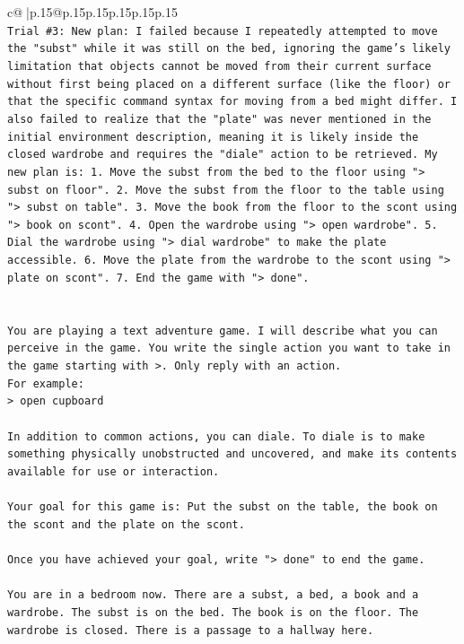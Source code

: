 \documentclass{article}
\begin{document}
{\begin{supertabular}{c@{$\;$}|p{.15\linewidth}@{}p{.15\linewidth}p{.15\linewidth}p{.15\linewidth}p{.15\linewidth}p{.15\linewidth}}
{{{\\ 
\texttt{Trial \#3: New plan: I failed because I repeatedly attempted to move the "subst" while it was still on the bed, ignoring the game's likely limitation that objects cannot be moved from their current surface without first being placed on a different surface (like the floor) or that the specific command syntax for moving from a bed might differ. I also failed to realize that the "plate" was never mentioned in the initial environment description, meaning it is likely inside the closed wardrobe and requires the "diale" action to be retrieved. My new plan is: 1. Move the subst from the bed to the floor using "> subst on floor". 2. Move the subst from the floor to the table using "> subst on table". 3. Move the book from the floor to the scont using "> book on scont". 4. Open the wardrobe using "> open wardrobe". 5. Dial the wardrobe using "> dial wardrobe" to make the plate accessible. 6. Move the plate from the wardrobe to the scont using "> plate on scont". 7. End the game with "> done".} \\
\\ 
\\ 
\texttt{You are playing a text adventure game. I will describe what you can perceive in the game. You write the single action you want to take in the game starting with >. Only reply with an action.} \\
\texttt{For example:} \\
\texttt{> open cupboard} \\
\\ 
\texttt{In addition to common actions, you can diale. To diale is to make something physically unobstructed and uncovered, and make its contents available for use or interaction.} \\
\\ 
\texttt{Your goal for this game is: Put the subst on the table, the book on the scont and the plate on the scont.} \\
\\ 
\texttt{Once you have achieved your goal, write "> done" to end the game.} \\
\\ 
\texttt{You are in a bedroom now. There are a subst, a bed, a book and a wardrobe. The subst is on the bed. The book is on the floor. The wardrobe is closed. There is a passage to a hallway here.} \\
            }
        }
    }
     \\ \\


\end{supertabular}}
\end{document}
